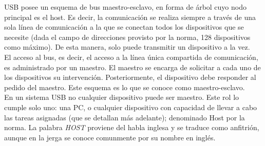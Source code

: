 USB posee un esquema de bus maestro-esclavo, en forma de árbol cuyo nodo principal es el host. Es decir, la comunicación se realiza siempre a través de una sola línea de comunicación a la que se conectan todos los dispositivos que se necesite (dada el campo de direcciones provisto por la norma, 128 dispositivos como máximo). De esta manera, solo puede transmitir un dispositivo a la vez.\\

El acceso al bus, es decir, el acceso a la línea única compartida de comunicación, es administrado por un maestro. El maestro se encarga de solicitar a cada uno de los dispositivos su intervención. Posteriormente, el dispositivo debe responder al pedido del maestro. Este esquema es lo que se conoce como maestro-esclavo.\\

En un sistema USB no cualquier dispositivo puede ser maestro. Este rol lo cumple solo uno: una PC, o cualquier dispositivo con capacidad de llevar a cabo las tareas asignadas (que se detallan más adelante); denominado Host por la norma. La palabra {\it HOST} proviene del habla inglesa y se traduce como anfitrión, aunque en la jerga se conoce comunmente por su nombre en inglés.\\

